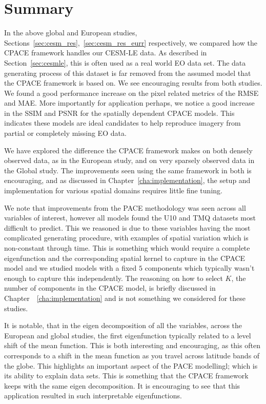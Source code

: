 \section{Summary \label{sec:cesm_summ}}
In the above global and European studies, Sections~\ref{sec:cesm_res},~\ref{sec:cesm_res_eurr} respectively, we compared how the CPACE framework handles our CESM-LE data.
As described in Section~\ref{sec:cesmle}, this is often used as a real world  EO data set.
The data generating process of this dataset is far removed from the assumed model that the CPACE framework is based on.
We see encouraging results from both studies.
We found  a good performance increase on the pixel related metrics of the RMSE and MAE.
More importantly for application perhaps, we notice a good increase in the SSIM and PSNR for the spatially dependent CPACE models.
This indicates these models are ideal candidates to help reproduce imagery from partial or completely missing EO data.

We have explored the difference the CPACE framework makes on both densely observed data, as in the European study, and on very sparsely observed data in the Global study.
The improvements seen using the same framework in both is encouraging, and as discussed in Chapter~\ref{cha:implementation}, the setup  and implementation for various spatial domains requires little fine tuning.

We note that improvements from the PACE methodology was seen across all variables of interest, however all models found the U10 and TMQ datasets most difficult to predict.
This we reasoned is due to these variables having the most complicated generating procedure, with examples of spatial variation which is non-constant through time.
This is something which would require a complete eigenfunction and the corresponding spatial kernel to capture in the CPACE model and we studied models with a fixed $5$ components which typically wasn't enough to capture this independently. 
The reasoning on how to select $K$, the number of components in the CPACE model, is briefly discussed in Chapter~~\ref{cha:implementation} and is not something we considered for these studies.

It is notable, that in the eigen decomposition of all the variables, across the European and global studies, the first eigenfunction typically related to a level shift of the mean function.
This is both interesting and encouraging, as this often corresponds to a shift in the mean function as you travel across latitude bands of the globe.
This highlights an important aspect of the PACE modellingl; which is its ability to explain data sets.
This is something that the CPACE framework keeps with the same eigen decomposition. 
It is encouraging to see that this application resulted in such interpretable eigenfunctions.